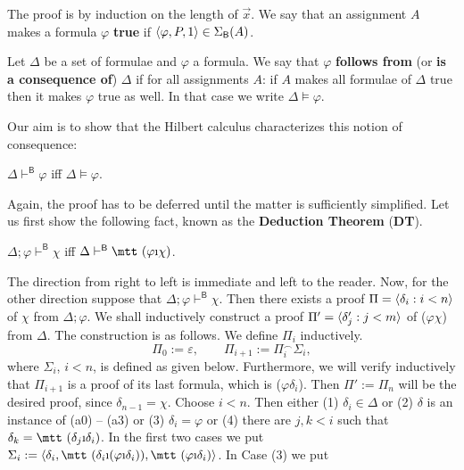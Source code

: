 The proof is by induction on the length of $\vec{x}$. We say that
an assignment $A$ makes a formula $\varphi$ \textbf{true} if $\langle
\varphi, P, 1\rangle \in \Sigma_{\mathsf{B}}(A)$.
\begin{defn}
Let $\Delta$ be a set of formulae and $\varphi$ a formula. We say
that $\varphi$ \textbf{follows from} (or \textbf{is a consequence of})
\index{$\vDash$}%
$\Delta$ if for all assignments $A$: if $A$ makes all formulae of
$\Delta$ true then it makes $\varphi$ true as well.
In that case we write $\Delta \vDash \varphi$.
\end{defn}
Our aim is to show that the Hilbert calculus characterizes this
notion of consequence:
\begin{thm}
\label{thm:hilbertmain}%
$\Delta \vdash^{\mathsf{B}} \varphi$ iff $\Delta
\vDash \varphi$.
\end{thm}
Again, the proof has to be deferred until the matter is
sufficiently simplified. Let us first show the following
fact, known as the \textbf{Deduction Theorem} (\textbf{DT}).
\begin{lem}
$\Delta; \varphi \vdash^{\mathsf{B}} \chi$ iff $\Delta
\vdash^{\mathsf{B}}
    \mbox{\mtt ($\varphi$\symbol{25}$\chi$)}$.
\end{lem}
\proofbeg 
The direction from right to left is immediate and left
to the reader. Now, for the other direction suppose that $\Delta;
\varphi \vdash^{\mathsf{B}} \chi$. Then there exists a proof $\Pi
= \langle \delta_i : i < n\rangle$ of $\chi$ from $\Delta;\varphi$.  We
shall inductively construct a proof $\Pi' = \langle \delta'_j : j <
m\rangle$ of {\mtt ($\varphi$$\chi$)} from $\Delta$.
The construction is as follows. We define $\Pi_i$ inductively. 
\begin{equation}
\Pi_0 := \varepsilon, \qquad \Pi_{i+1} := \Pi_i^{\smallfrown}\Sigma_i,
\end{equation}
where $\Sigma_i$, $i < n$, is defined as given below. Furthermore,
we will verify inductively that $\Pi_{i+1}$ is a proof of its last
formula, which is {\mtt ($\varphi$$\delta_i$)}.
Then $\Pi' := \Pi_n$ will be the desired proof, since $\delta_{n-1}
= \chi$.  Choose $i < n$. Then either (1) $\delta_i \in \Delta$ or
(2) $\delta$ is an instance of (a0) -- (a3) or (3) $\delta_i = \varphi$
or (4) there are $j, k < i$ such that $\delta_k = \mbox{\mtt ($\delta_j$%
\symbol{25}$\delta_i$)}$. In the first two cases we put
$\Sigma_i := \auf\delta_i, \mbox{\mtt ($\delta_i$\symbol{25}(%
$\varphi$\symbol{25}$\delta_i$))}, \mbox{\mtt ($\varphi$%
\symbol{25}$\delta_i$)}\zu$. In Case (3) we put
